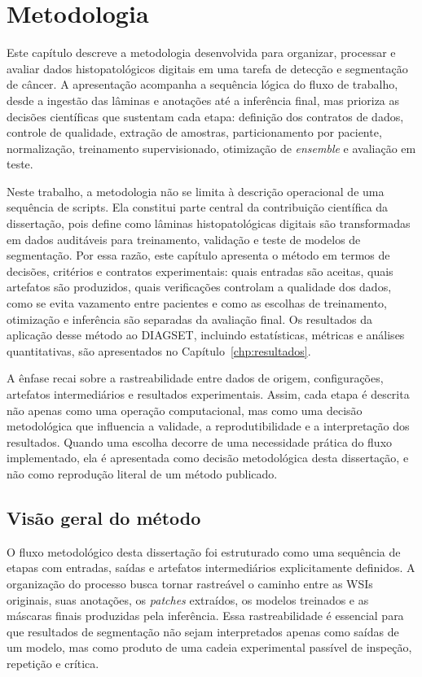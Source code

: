 \chapter{Metodologia}\label{chp:desenvolvimento} Este capítulo descreve a metodologia desenvolvida para organizar, processar e avaliar dados histopatológicos digitais em uma tarefa de detecção e segmentação de câncer. A apresentação acompanha a sequência lógica do fluxo de trabalho, desde a ingestão das lâminas e anotações até a inferência final, mas prioriza as decisões científicas que sustentam cada etapa: definição dos contratos de dados, controle de qualidade, extração de amostras, particionamento por paciente, normalização, treinamento supervisionado, otimização de \textit{ensemble} e avaliação em teste. 

Neste trabalho, a metodologia não se limita à descrição operacional de uma sequência de scripts. Ela constitui parte central da contribuição científica da dissertação, pois define como lâminas histopatológicas digitais são transformadas em dados auditáveis para treinamento, validação e teste de modelos de segmentação. Por essa razão, este capítulo apresenta o método em termos de decisões, critérios e contratos experimentais: quais entradas são aceitas, quais artefatos são produzidos, quais verificações controlam a qualidade dos dados, como se evita vazamento entre pacientes e como as escolhas de treinamento, otimização e inferência são separadas da avaliação final. Os resultados da aplicação desse método ao DIAGSET, incluindo estatísticas, métricas e análises quantitativas, são apresentados no Capítulo~\ref{chp:resultados}. 

A ênfase recai sobre a rastreabilidade entre dados de origem, configurações, artefatos intermediários e resultados experimentais. Assim, cada etapa é descrita não apenas como uma operação computacional, mas como uma decisão metodológica que influencia a validade, a reprodutibilidade e a interpretação dos resultados. Quando uma escolha decorre de uma necessidade prática do fluxo implementado, ela é apresentada como decisão metodológica desta dissertação, e não como reprodução literal de um método publicado.

\section{Visão geral do método}\label{sec:met_visao_geral}

O fluxo metodológico desta dissertação foi estruturado como uma sequência de etapas com entradas, saídas e artefatos intermediários explicitamente definidos.
A organização do processo busca tornar rastreável o caminho entre as WSIs originais, suas anotações, os \textit{patches} extraídos, os modelos treinados e as máscaras finais produzidas pela inferência. Essa rastreabilidade é essencial
para que resultados de segmentação não sejam interpretados apenas como saídas de um modelo, mas como produto de uma cadeia experimental passível de inspeção, repetição e crítica.

